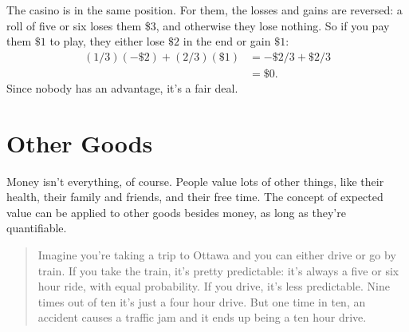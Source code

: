 \documentclass[justified]{tufte-book}
\newenvironment{problem}{\begin{quote}\normalsize}{\end{quote}}
\theoremstyle{definition}
\theoremstyle{definition}
\theoremstyle{definition}
\theoremstyle{definition}
\theoremstyle{remark}
\begin{document}
The casino is in the same position. For them, the losses and gains are reversed: a roll of five or six loses them \$3, and otherwise they lose nothing. So if you pay them \(\$1\) to play, they either lose \(\$2\) in the end or gain \(\$1\):
\[
  \begin{aligned}
    (1/3)(-\$2) + (2/3)(\$1) &= -\$2/3 + \$2/3\\
      &= \$0.
  \end{aligned}
\]
Since nobody has an advantage, it's a fair deal.

\hypertarget{other-goods}{%
\section{Other Goods}\label{other-goods}}

Money isn't everything, of course. People value lots of other things, like their health, their family and friends, and their free time. The concept of expected value can be applied to other goods besides money, as long as they're quantifiable.

\begin{problem}
Imagine you're taking a trip to Ottawa and you can either drive or go by
train. If you take the train, it's pretty predictable: it's always a
five or six hour ride, with equal probability. If you drive, it's less
predictable. Nine times out of ten it's just a four hour drive. But one
time in ten, an accident causes a traffic jam and it ends up being a ten
hour drive.
\end{problem}
\end{document}
